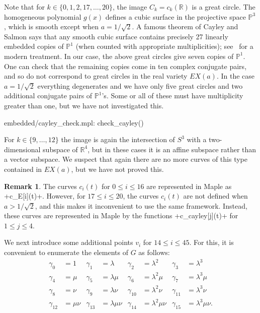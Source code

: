 \documentclass[reqno]{amsart}
\newcommand{\gm}        {\gamma}
\newcommand{\lm}        {\lambda}
\newcommand{\R}         {{\mathbb{R}}}
\newcommand{\rt}        {\sqrt{2}}
\renewcommand{\:}{\colon}
\theoremstyle{definition}
\newtheorem{remark}[theorem]{Remark}
\begin{document}
Note that for $k\in\{0,1,2,17,\dotsc,20\}$, the image $C_k=c_k(\R)$ is
a great circle.  The homogeneous polynomial $g(x)$ defines a cubic
surface in the projective space $\mathbb{P}^3$, which is smooth except
when $a=1/\rt$.  A famous theorem of Cayley and Salmon says that any
smooth cubic surface contains precisely 27 linearly embedded copies of
$\mathbb{P}^1$ (when counted with appropriate multiplicities);
see~\cite[Theorem 9.1.13]{do:cag} for a modern treatment.  In our
case, the above great circles give seven copies of $\mathbb{P}^1$.
One can check that the remaining copies come in ten complex conjugate
pairs, and so do not correspond to great circles in the real variety
$EX(a)$.  In the case $a=1/\rt$ everything degenerates and we have
only five great circles and two additional conjugate pairs of
$\mathbb{P}^1$'s.  Some or all of these must have multiplicity greater
than one, but we have not investigated this.
\begin{checks}
 embedded/cayley_check.mpl: check_cayley()
\end{checks}

For $k\in\{9,\dotsc,12\}$ the image is again the intersection of $S^3$
with a two-dimensional subspace of $\R^4$, but in these cases it is an
affine subspace rather than a vector subspace.  We suspect that again
there are no more curves of this type contained in $EX(a)$, but we
have not proved this.

\begin{remark}
 The curves $c_i(t)$ for $0\leq i\leq 16$ are represented in Maple as
 \mcode+c_E[i](t)+.  However, for $17\leq i\leq 20$, the curves
 $c_i(t)$ are not defined when $a>1/\rt$, and this makes it
 inconvenient to use the same framework.  Instead, these curves are
 represented in Maple by the functions \mcode+c_cayley[j](t)+ for
 $1\leq j\leq 4$.
\end{remark}

We next introduce some additional points $v_i$ for $14\leq i\leq 45$.
For this, it is convenient to enumerate the elements of $G$ as
follows:
\begin{align*}
 \gm_0    &= 1           & \gm_1    &= \lm &
 \gm_2    &= \lm^2       & \gm_3    &= \lm^3 \\
 \gm_4    &= \mu         & \gm_5    &= \lm\mu &
 \gm_6    &= \lm^2\mu    & \gm_7    &= \lm^3\mu \\
 \gm_8    &= \nu         & \gm_9    &= \lm\nu &
 \gm_{10} &= \lm^2\nu    & \gm_{11} &= \lm^3\nu \\
 \gm_{12} &= \mu\nu      & \gm_{13} &= \lm\mu\nu &
 \gm_{14} &= \lm^2\mu\nu & \gm_{15} &= \lm^3\mu\nu.
\end{align*}
\end{document}
